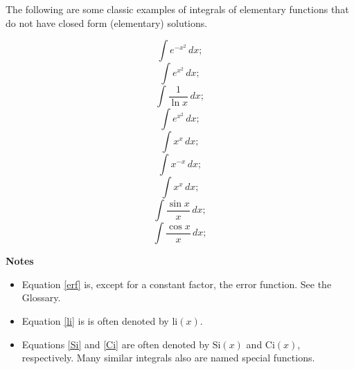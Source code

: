 \renewcommand{\thefootnote}{\fnsymbol{footnote}}	
The following are some classic examples of integrals of elementary
functions that do not have closed form (\gls{elementary}) solutions.

\begin{equation}
\label{erf}
\int{e^{-x^2}\,dx};
\end{equation}
\begin{equation}
\label{exp_x_squared}
\int{e^{x^2}\,dx};
\end{equation}
\begin{equation}
\label{li}
\int{\frac{1}{\ln{x}}\,dx};
\end{equation}
\begin{equation}
\label{exp_x_squared}
\int{e^{x^2}\,dx};
\end{equation}
\begin{equation}
\label{x_to_the_x}
\int{x^x\,dx};
\end{equation}
\begin{equation}
\label{x_to_the_neg_x}
\int{x^{-x}\,dx};
\end{equation}
\begin{equation}
\label{x_to_the_x}
\int{x^x\,dx};
\end{equation}
\begin{equation}
\label{Si}
\int{\frac{\sin{x}}{x}\,dx};
\end{equation}
\begin{equation}
\label{Ci}
\int{\frac{\cos{x}}{x}\,dx};
\end{equation}

\textbf{Notes}
\begin{itemize}
\item Equation \ref{erf} is, except for a constant factor, the
\gls{error function}.  See the Glossary.
\item Equation \ref{li} is is often denoted by $\mathrm{li}(x)$.
\item Equations \ref{Si} and \ref{Ci} are often denoted by
$\mathrm{Si}(x)$ and $\mathrm{Ci}(x)$, respectively.  Many similar
integrals also are named special functions.
\end{itemize}